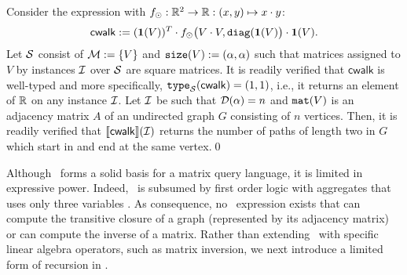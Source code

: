 \begin{example}Consider the  expression with $f_\odot:\mathbb{R}^2\to\mathbb{R}:(x,y)\mapsto x\cdot y$:
$$\mathsf{cwalk}:= (\mathbf{1}(V))^T\cdot f_{\odot}\bigl(V\cdot V, \texttt{diag}(\mathbf{1}(V)\bigr)\cdot\mathbf{1}(V).$$
Let $\mathcal{S}$  consist of $\mathcal{M}:=\{V\}$ and $\texttt{size}(V):=(\alpha,\alpha)$ such that
matrices assigned to $V$ by instances $\mathcal{I}$ over $\mathcal{S}$ are square matrices.
It is readily verified that $\mathsf{cwalk}$ is well-typed and more specifically, $\texttt{type}_{\mathcal{S}}(\mathsf{cwalk})=(1,1)$, i.e., it returns an element of $\mathbb{R}$ on any  instance $\mathcal{I}$. Let $\mathcal{I}$ be such that $\mathcal{D}(\alpha)=n$ and  $\texttt{mat}(V)$ is an adjacency matrix $A$ of an undirected graph $G$ consisting of $n$ vertices. Then, it is readily verified that $\llbracket \mathsf{cwalk} \rrbracket(\mathcal{I})$ returns the number of paths of length two in $G$ which start in and end at the same vertex.\qed
\end{example}

Although \lang\ forms a solid basis for a matrix query language, it is limited in expressive power. Indeed, \lang\ is subsumed by first order logic with aggregates that uses only three variables \cite{matlang}. As consequence, no \lang\ expression exists that can compute the transitive closure of a graph (represented by its adjacency matrix) or can compute the inverse of a matrix. Rather than extending \lang\ with specific linear algebra operators, such as matrix inversion, we next introduce a limited form of recursion in \lang.

